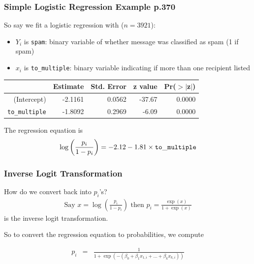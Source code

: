 \documentclass[handout]{beamer}
\newcommand{\blue}[1]{\textcolor{blue2}{#1}}
\begin{document}
\begin{frame}[fragile]
\frametitle{Simple Logistic Regression Example p.370}

So say we fit a logistic regression with ($n=3921$):
\begin{itemize}
\item $Y_i$ is {\tt spam}:  binary variable of whether message was classified as spam (1 if spam)
\item $x_i$ is {\tt to\_multiple}:  binary variable indicating if more than one recipient listed
\end{itemize}
\pause
\begin{table}[ht]
\centering
\begin{tabular}{r|rrrr}
  \hline
 & Estimate & Std. Error & z value & Pr($>$$|$z$|$) \\ 
  \hline
(Intercept) & -2.1161 & 0.0562 & -37.67 & 0.0000 \\ 
  {\tt to\_multiple} & -1.8092 & 0.2969 & -6.09 & 0.0000 \\ 
   \hline
\end{tabular}
\end{table}

%
%
The regression equation is
\[
\log\left(\frac{p_i}{1-p_i}\right) = -2.12 - 1.81 \times {\tt to\_multiple} 
\]

\end{frame}


\begin{frame}[fragile]
\frametitle{Inverse Logit Transformation}
%
%
How do we convert back into $p_i$'s?
\pause
\begin{eqnarray*}
\mbox{Say } x = \log\left(\frac{p_i}{1-p_i}\right) \mbox{ then } p_i = \frac{\exp(x)}{1 + \exp(x)}
\end{eqnarray*}
is the \blue{inverse logit transformation}.

\vspace{0.5cm}
\pause
So to convert the regression equation to probabilities, we compute

\begin{eqnarray*}
p_i &=& \frac{1}{1 + \exp(-(\beta_0 + \beta_1 x_{1,i} + \ldots + \beta_k x_{k,i}))}
\end{eqnarray*}


\end{frame}
\end{document}
